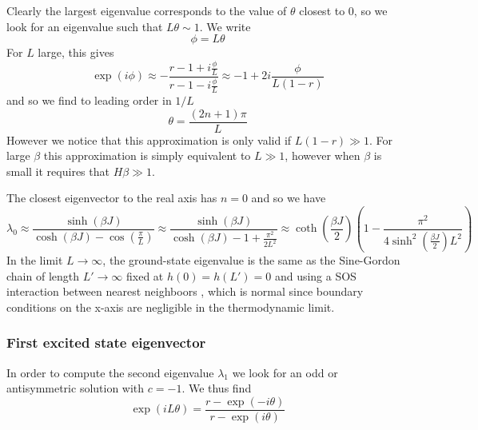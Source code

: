 Clearly the largest eigenvalue corresponds to the value of $\theta$ closest to $0$,  so we look for an eigenvalue such that $L \theta \sim 1$. We write
\begin{equation}
\phi = L \theta
\end{equation}
For $L$ large, this gives
\begin{equation}
\exp(i\phi) \approx -\frac{r-1+ i\frac{\phi}{L}}{ r-1- i\frac{\phi}{L}}\approx -1 +2 i\frac{\phi}{L(1-r)}
\end{equation}
and so we find to leading order in $1/L$
\begin{equation}
\theta = \frac{(2n+1)\pi}{L}
\end{equation}
However we notice that this approximation is only valid if $L(1-r) \gg1$. For large $\beta$ this approximation is simply equivalent to $L\gg1$, however when $\beta$ is small it requires
that $H \beta \gg 1$.

The closest eigenvector to the real axis has $n=0$ and so we have
\begin{equation}
\lambda_0 \approx \frac{\sinh(\beta J)}{\cosh(\beta J) - \cos(\frac{\pi}{L})} \approx \frac{\sinh(\beta J)}{\cosh(\beta J) - 1+ \frac{\pi^2}{2 L^2}} \approx \coth(\frac{\beta J}{2})(1 - \frac{\pi^2}{4\sinh^2(\frac{\beta J}{2}) L^2})
\label{ground-sos}
\end{equation}
{\color{red} In the limit $L\to \infty$, the ground-state eigenvalue is the same as the Sine-Gordon chain of length $L' \to \infty$ fixed at $h(0) = h(L') = 0$ and using a SOS interaction between nearest neighboors \cite{guyer_sine-gordon_1979}, which is normal since boundary conditions on the x-axis are negligible in the thermodynamic limit.}

\subsubsection*{First excited state eigenvector}
In order to compute the second eigenvalue $\lambda_1$ we look for an odd or antisymmetric solution with $c=-1$. We thus find
\begin{equation}
\exp(i L\theta) = \frac{r-\exp(-i\theta)}{r-\exp(i\theta)}
\label{theta}
\end{equation}


